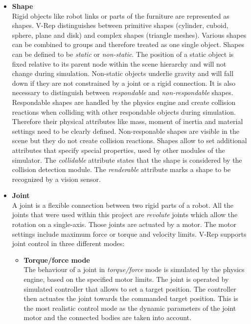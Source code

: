 \begin{itemize}
\item \textbf{Shape} \\

Rigid objects like robot links or parts of the furniture are represented as shapes. V-Rep distinguishes between primitive shapes (cylinder, cuboid, sphere, plane and disk) and complex shapes (triangle meshes). Various shapes can be combined to groups and therefore treated as one single object. Shapes can be defined to be \emph{static} or \emph{non-static}. The position of a static object is fixed relative to its parent node within the scene hierarchy and will not change during simulation. Non-static objects underlie gravity and will fall down if they are not constrained by a joint or a rigid connection. It is also necessary to distinguish between \emph{respondable} and \emph{non-respondable} shapes. Respondable shapes are handled by the physics engine and create collision reactions when colliding with other respondable objects during simulation. Therefore their physical attributes like mass, moment of inertia and material settings need to be clearly defined. Non-responable shapes are visible in the scene but they do not create collision reactions. Shapes allow to set additional attributes that specify special properties, used by other modules of the simulator. The \emph{collidable} attribute states that the shape is considered by the collision detection module. The \emph{renderable} attribute marks a shape to be recognized by a vision sensor.

\item \textbf{Joint} \\
A joint is a flexible connection between two rigid parts of a robot. All the joints that were used within this project are \emph{revolute} joints which allow the rotation on a single-axis. Those joints are actuated by a motor. The motor settings include maximum force or torque and velocity limits. V-Rep supports joint control in three different modes:
\begin{itemize}

\item \textbf{Torque/force mode} \\
The behaviour of a joint in \emph{torque/force} mode is simulated by the physics engine, based on the specified motor limits. The joint is operated by simulated controller that allows to set a target position. The controller then actuates the joint towards the commanded target position. This is the most realistic control mode as the dynamic parameters of the joint motor and the connected bodies are taken into account.


\end{itemize}
\end{itemize}
